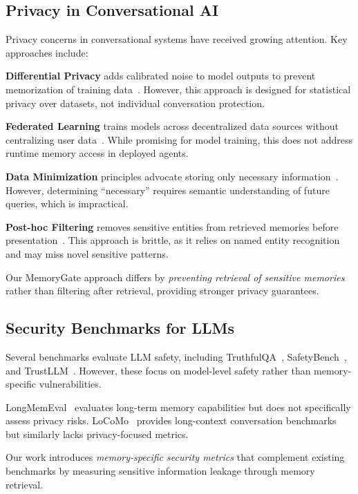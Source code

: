 \documentclass[conference]{IEEEtran}
\begin{document}
\subsection{Privacy in Conversational AI}

Privacy concerns in conversational systems have received growing attention. Key approaches include:

\textbf{Differential Privacy} adds calibrated noise to model outputs to prevent memorization of training data~\cite{dwork2014algorithmic}. However, this approach is designed for statistical privacy over datasets, not individual conversation protection.

\textbf{Federated Learning} trains models across decentralized data sources without centralizing user data~\cite{mcmahan2017communication}. While promising for model training, this does not address runtime memory access in deployed agents.

\textbf{Data Minimization} principles advocate storing only necessary information~\cite{gdpr2016}. However, determining ``necessary'' requires semantic understanding of future queries, which is impractical.

\textbf{Post-hoc Filtering} removes sensitive entities from retrieved memories before presentation~\cite{liu2024privacy}. This approach is brittle, as it relies on named entity recognition and may miss novel sensitive patterns.

Our MemoryGate approach differs by \textit{preventing retrieval of sensitive memories} rather than filtering after retrieval, providing stronger privacy guarantees.

\subsection{Security Benchmarks for LLMs}

Several benchmarks evaluate LLM safety, including TruthfulQA~\cite{lin2022truthfulqa}, SafetyBench~\cite{zhang2024safetybench}, and TrustLLM~\cite{sun2024trustllm}. However, these focus on model-level safety rather than memory-specific vulnerabilities.

LongMemEval~\cite{liu2024longmemeval} evaluates long-term memory capabilities but does not specifically assess privacy risks. LoCoMo~\cite{maharana2024evaluating} provides long-context conversation benchmarks but similarly lacks privacy-focused metrics.

Our work introduces \textit{memory-specific security metrics} that complement existing benchmarks by measuring sensitive information leakage through memory retrieval.
\end{document}
